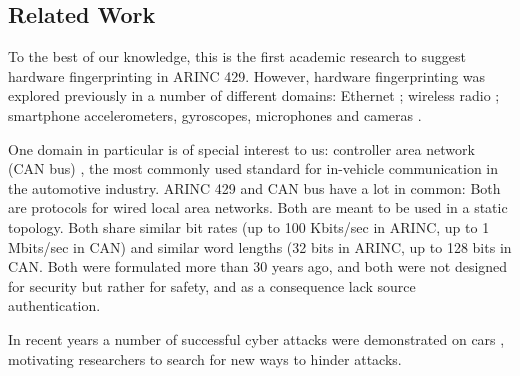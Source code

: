 \documentclass[conference]{IEEEtran}
\begin{document}

\subsection{Related Work} \label{RelatedWork}
  To the best of our knowledge, this is the first academic research to suggest hardware fingerprinting in ARINC 429. However, hardware fingerprinting was explored previously in a number of different domains: Ethernet \cite{kohno2005remote, uluagac2013passive, gerdes2012physical}; wireless radio \cite{ellis2001characteristics, brik2008wireless, xu2015device}; smartphone accelerometers, gyroscopes, microphones and cameras \cite{dey2014accelprint, das2016tracking}.
  
  One domain in particular is of special interest to us: controller area network (CAN bus) \cite{}, the most commonly used standard for in-vehicle communication in the automotive industry. ARINC 429 and CAN bus have a lot in common: Both are protocols for wired local area networks. Both are meant to be used in a static topology. Both share similar bit rates (up to 100 Kbits/sec in ARINC, up to 1 Mbits/sec in CAN) and similar word lengths (32 bits in ARINC, up to 128 bits in CAN. Both were formulated more than 30 years ago, and both were not designed for security but rather for safety, and as a consequence lack source authentication.
  
  In recent years a number of successful cyber attacks were demonstrated on cars \cite{}, motivating researchers to search for new ways to hinder attacks.
  
\end{document}
